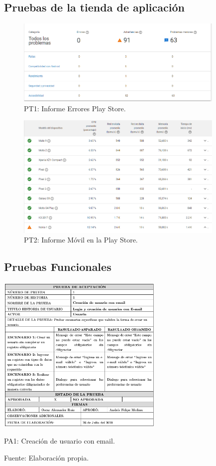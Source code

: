 \documentclass[12pt,letterpaper,openany]{book}
\begin{document}
\subsection{Pruebas de la tienda de aplicación}
\begin{figure}[H]
\begin{center}
\includegraphics[width=10cm]{./imagenes/Test/Informe_errores_play_store}
\caption{PT1: Informe Errores Play Store.}
\end{center}
\end{figure}

\begin{figure}[H]
\begin{center}
\includegraphics[width=10cm]{./imagenes/Test/Informe_movile_play_console}
\caption{PT2: Informe Móvil en la Play Store.}
\end{center}
\end{figure}

\subsection{Pruebas Funcionales}
\begin{table}[H]
\centering
\includegraphics[width=8cm]{./imagenes/PA/PA1}
\caption{PA1: Creación de usuario con email.}
\centering Fuente: Elaboración propia.
\end{table}
\end{document}
